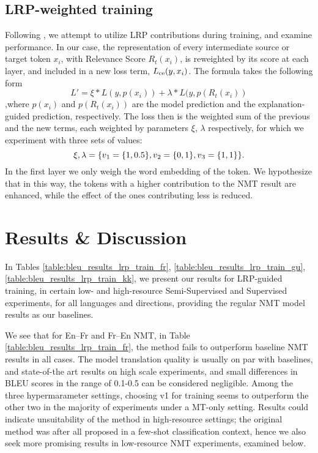 \documentclass[11pt]{article}
\begin{document}
\subsection{LRP-weighted training}
Following \citet{sun2021explanation}, we attempt to utilize LRP contributions during training, and examine performance. In our case, the representation of every intermediate source or target token $x_{i}$, with Relevance Score $R_t(x_i)$, is reweighted by its score at each layer, and included in a new loss term, $L\textsubscript{ce} (y,x_{i})$. The formula takes the following form
\begin{equation}
L' = \xi * L (y,p(x_i)) + \lambda * L (y, p({R_t}(x_i))\end{equation},where $p(x_i)$ and $p({R_t}(x_i))$ are the model prediction and the explanation-guided prediction, respectively.
The loss then is the weighted sum of the previous and the new terms, each weighted by parameters $\xi$, $\lambda$ respectively, for which we experiment with three sets of values:
\begin{equation}
\xi, \lambda = \{v\textsubscript{1} = \{1,0.5\}, v\textsubscript{2} = \{0,1\}, v\textsubscript{3} = \{1,1\}\}.
\end{equation}
In the first layer we only weigh the word embedding of the token.
We hypothesize that in this way, the tokens with a higher contribution to the NMT result are enhanced, while the effect of the ones contributing less is reduced.




\section{Results \& Discussion}
In Tables \ref{table:bleu_results_lrp_train_fr}, 
\ref{table:bleu_results_lrp_train_gu},
\ref{table:bleu_results_lrp_train_kk}, we present our results for LRP-guided training, in certain low- and high-resource Semi-Supervised and Supervised experiments, for all languages and directions, providing the regular NMT model results as our baselines.

We see that for En--Fr and Fr--En NMT, in Table \ref{table:bleu_results_lrp_train_fr}, the method fails to outperform baseline NMT results in all cases. The model translation quality is usually on par with baselines, and state-of-the art results on high scale experiments, and small differences in BLEU scores in the range of 0.1-0.5 can be considered negligible. 
Among the three hypermarameter settings, choosing v1 for training seems to outperform the other two in the majority of experiments under a MT-only setting. 
Results could indicate unsuitability of the method in high-resource settings; the original method was after all proposed in a few-shot classification context, hence we also seek more promising results in low-resource NMT experiments, examined below.
\end{document}
